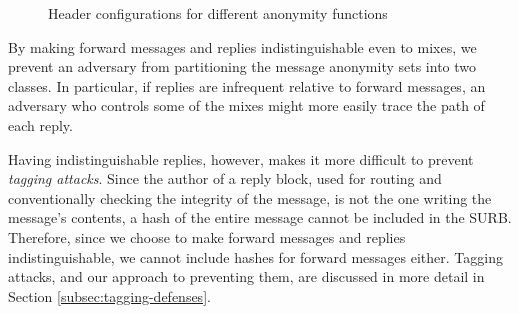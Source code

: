 \documentclass[final,inpress,inline]{ieee}
\begin{document}
\begin{figure}
\begin{center}
\caption{Header configurations for different anonymity functions} 
\end{center}
\end{figure}

By making forward messages and replies indistinguishable even to mixes,
we prevent an
adversary from partitioning the message anonymity sets into two classes. In
particular, if replies are infrequent relative to forward messages,
an adversary who controls some of the mixes might more easily trace the
path of each reply.

Having indistinguishable replies, however, makes it more difficult to
prevent \emph{tagging attacks}. Since the author of a reply block,
used for routing and conventionally checking the integrity of the
message, is not the 
one writing the message's contents, a hash of the entire message
cannot be included in the SURB. 
Therefore, since we choose to make forward messages and replies
indistinguishable, we cannot include hashes for forward messages either.
Tagging attacks, and our approach to preventing them, are discussed in more
detail in Section \ref{subsec:tagging-defenses}.

\end{document}
